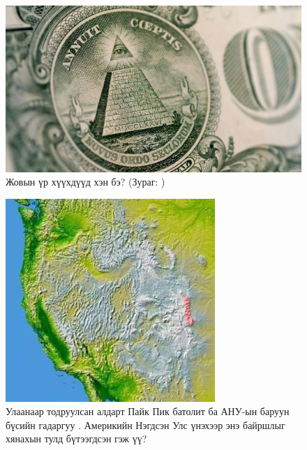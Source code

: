 \documentclass[10pt,twocolumn,letterpaper]{article}
\begin{document}
\begin{figure}[t]
\begin{center}
   \includegraphics[width=1\linewidth]{illuminati.jpg}
\end{center}
   \caption{Жовын үр хүүхдүүд хэн бэ? (Зураг: \cite{35})}
\label{fig:10}
\label{fig:onecol}
\end{figure}

\begin{figure}[t]
\begin{center}
   \includegraphics[width=1\linewidth]{pike.jpg}
\end{center}
   \caption{Улаанаар тодруулсан алдарт Пайк Пик батолит ба АНУ-ын баруун бүсийн гадаргуу \cite{36}. Америкийн Нэгдсэн Улс үнэхээр энэ байршлыг хянахын тулд бүтээгдсэн гэж үү?}
\label{fig:11}
\label{fig:onecol}
\end{figure}
\end{document}
